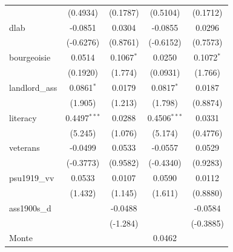 \begin{table}[htbp]
\begin{tabular}{lcccc}
                                       & (0.4934)              & (0.1787)               & (0.5104)               & (0.1712)\\   
      dlab                             & -0.0851               & 0.0304                 & -0.0855                & 0.0296\\   
                                       & (-0.6276)             & (0.8761)               & (-0.6152)              & (0.7573)\\   
      bourgeoisie                      & 0.0514                & 0.1067$^{*}$           & 0.0250                 & 0.1072$^{*}$\\   
                                       & (0.1920)              & (1.774)                & (0.0931)               & (1.766)\\   
      landlord\_ass                    & 0.0861$^{*}$          & 0.0179                 & 0.0817$^{*}$           & 0.0187\\   
                                       & (1.905)               & (1.213)                & (1.798)                & (0.8874)\\   
      literacy                         & 0.4497$^{***}$        & 0.0288                 & 0.4506$^{***}$         & 0.0331\\   
                                       & (5.245)               & (1.076)                & (5.174)                & (0.4776)\\   
      veterans                         & -0.0499               & 0.0533                 & -0.0557                & 0.0529\\   
                                       & (-0.3773)             & (0.9582)               & (-0.4340)              & (0.9283)\\   
      psu1919\_vv                      & 0.0533                & 0.0107                 & 0.0590                 & 0.0112\\   
                                       & (1.432)               & (1.145)                & (1.611)                & (0.8880)\\   
      ass1900s\_d                      &                       & -0.0488                &                        & -0.0584\\   
                                       &                       & (-1.284)               &                        & (-0.3885)\\   
      Monte                            &                       &                        & 0.0462                 &   \\   

\end{tabular}
\end{table}
